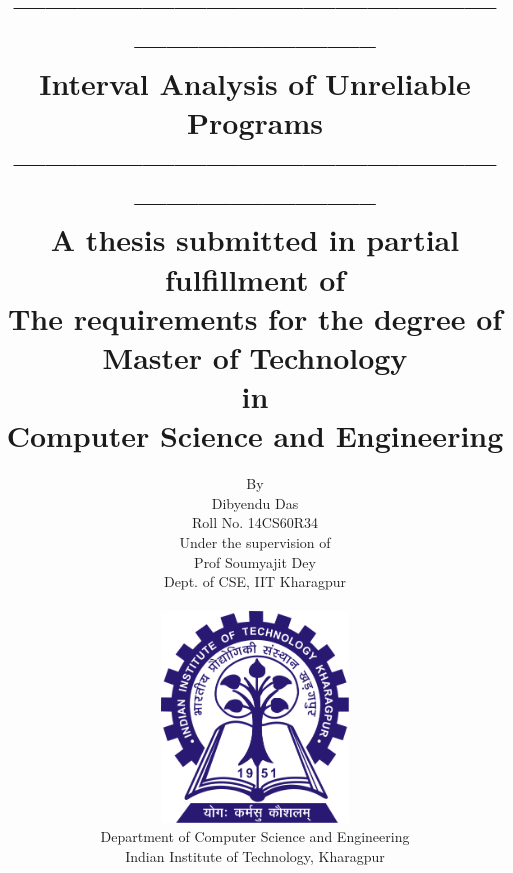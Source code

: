\documentclass[final,3p, review, times]{util/elsarticle}
\begin{document}
\title{
{--------------------------------------------------------------------}\\
{Interval Analysis of Unreliable Programs}\\
{--------------------------------------------------------------------}\\
{\large A thesis submitted in partial fulfillment of\\
The requirements for the degree of Master of Technology\\
in\\
Computer Science and Engineering\\}
}
\author{By\\
Dibyendu Das\\
Roll No. 14CS60R34\\
Under the supervision of\\
Prof Soumyajit Dey\\
Dept. of CSE, IIT Kharagpur\\~\\
\includegraphics[width=5cm]{logo.jpg}\\
Department of Computer Science and Engineering\\
Indian Institute of Technology, Kharagpur}
\maketitle
\clearpage

\tableofcontents

\clearpage
{}
\end{document}
